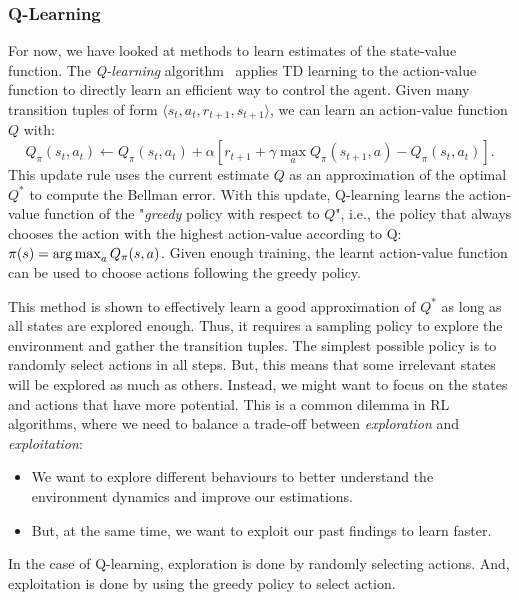 \subsubsection{Q-Learning}\label{sec:RL:Qlearning}

For now, we have looked at methods to learn estimates of the state-value function. The \textit{Q-learning} algorithm~\citep{Watkins1989_RL} applies TD learning to the action-value function to directly learn an efficient way to control the agent. Given many transition tuples of form $\langle s_t,a_t,r_{t+1},s_{t+1}\rangle$, we can learn an action-value function $Q$ with:
\begin{equation}
    Q_\pi(s_t,a_t)\leftarrow Q_\pi(s_t,a_t)+\alpha\left[r_{t+1}+\gamma\max_aQ_\pi(s_{t+1},a)-Q_\pi(s_t,a_t)\right].
    \label{eq:Qlearning}
\end{equation}
This update rule uses the current estimate $Q$ as an approximation of the optimal $Q^*$ to compute the Bellman error. With this update, Q-learning learns the action-value function of the "\textit{greedy} policy with respect to $Q$", i.e., the policy that always chooses the action with the highest action-value according to Q: $\pi(s)=\operatorname*{arg\,max}_aQ_\pi(s,a)$. Given enough training, the learnt action-value function can be used to choose actions following the greedy policy. 

This method is shown to effectively learn a good approximation of $Q^*$ as long as all states are explored enough. Thus, it requires a sampling policy to explore the environment and gather the transition tuples. The simplest possible policy is to randomly select actions in all steps. But, this means that some irrelevant states will be explored as much as others. Instead, we might want to focus on the states and actions that have more potential. This is a common dilemma in RL algorithms, where we need to balance a trade-off between \textit{exploration} and \textit{exploitation}:
\begin{itemize}
    \item We want to explore different behaviours to better understand the environment dynamics and improve our estimations. 
    \item But, at the same time, we want to exploit our past findings to learn faster.
\end{itemize}
In the case of Q-learning, exploration is done by randomly selecting actions. And, exploitation is done by using the greedy policy to select action.  

